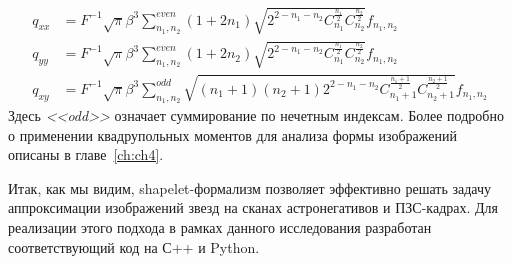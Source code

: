 \begin{align}\label{moments}
 q_{xx} & = F^{-1} \sqrt{\pi} \beta^3 \sum^{even}_{n_1,n_2} (1+2n_1) \sqrt{2^{2-n_1-n_2}C^{\frac{n_1}{2}}_{n_1}C^{\frac{n_2}{2}}_{n_2}}f_{n_1,n_2} \\
 q_{yy} & = F^{-1} \sqrt{\pi} \beta^3 \sum^{even}_{n_1,n_2} (1+2n_2) \sqrt{2^{2-n_1-n_2}C^{\frac{n_1}{2}}_{n_1}C^{\frac{n_2}{2}}_{n_2}}f_{n_1,n_2} \\
 q_{xy} & = F^{-1} \sqrt{\pi} \beta^3 \sum^{odd}_{n_1,n_2} \sqrt{(n_1+1)(n_2+1)2^{2-n_1-n_2}C^{\frac{n_1+1}{2}}_{n_1+1}C^{\frac{n_2+1}{2}}_{n_2+1}}f_{n_1,n_2}
\end{align}
Здесь \textit{<<odd>>} означает суммирование по нечетным индексам.
Более подробно о применении квадрупольных моментов для анализа формы изображений описаны в главе~\ref{ch:ch4}.

Итак, как мы видим, shapelet-формализм позволяет эффективно решать задачу аппроксимации изображений звезд на сканах астронегативов и ПЗС-кадрах. Для реализации этого подхода в рамках данного исследования разработан соответствующий код на С++ и Python.
